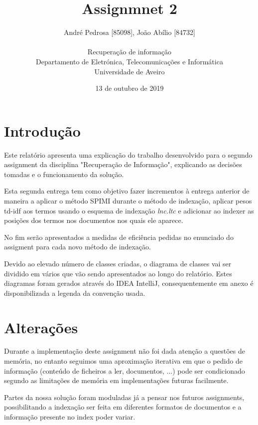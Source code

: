 \documentclass[12pt]{article}
\title{Assignmnet 2}
\author{
    André Pedrosa [85098], João Abílio [84732]\\
    \\
    Recuperação de informação\\
    \normalsize{Departamento de Eletrónica, Telecomunicações e Informática}\\
    \normalsize{Universidade de Aveiro}\\
}
\date{13 de outubro de 2019}
\begin{document}
\baselineskip18pt

\maketitle

\section{Introdução}
Este relatório apresenta uma explicação do trabalho desenvolvido
para o segundo assignment da disciplina "Recuperação de Informação",
explicando as decisões tomadas e o funcionamento da solução.

Esta segunda entrega tem como objetivo fazer incrementos à entrega anterior
de maneira a aplicar o método SPIMI durante o método de indexação, aplicar
pesos td-idf aos termos usando o esquema de indexação {\it lnc.ltc} e adicionar
ao indexer as posições dos termos nos documentos nos quais ele aparece.

No fim serão apresentados a medidas de eficiência pedidas no enunciado do
assigment para cada novo método de indexação.

Devido ao elevado número de classes criadas, o diagrama de classes vai ser
dividido em vários que vão sendo apresentados ao longo do relatório. Estes
diagramas foram gerados através do IDEA IntelliJ, consequentemente em anexo
é disponibilizada a legenda da convenção usada.

\section{Alterações}
Durante a implementação deste assignment não foi dada atenção a questões de memória,
no entanto seguimos uma aproximação iterativa em que o pedido de informação
(conteúdo de ficheiros a ler, documentos, ...) pode ser condicionado segundo as
limitações de memória em implementações futuras facilmente.

Partes da nossa solução foram moduladas já a pensar nos futuros assignments,
possibilitando a indexação ser feita em diferentes formatos de documentos e a informação
presente no index poder variar.
\end{document}
